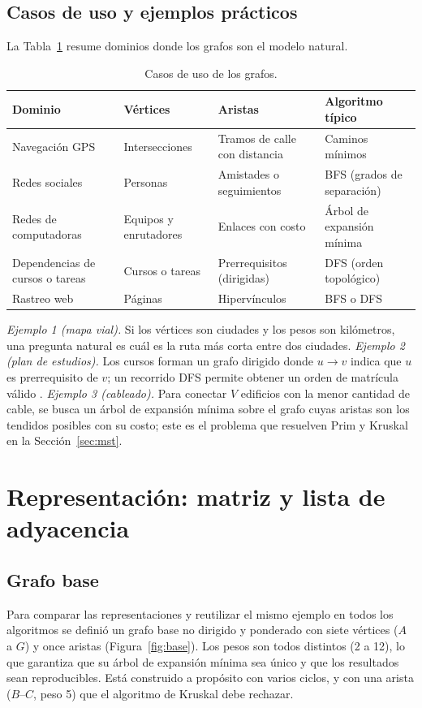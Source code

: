 \documentclass[conference]{IEEEtran}
\begin{document}
\subsection{Casos de uso y ejemplos prácticos}
La Tabla~\ref{tab:usos} resume dominios donde los grafos son el modelo natural.

\begin{table}[t]
\caption{Casos de uso de los grafos.}
\label{tab:usos}
\centering
\footnotesize
\setlength{\tabcolsep}{2pt}
\begin{tabular}{@{}p{1.9cm}p{2.0cm}p{1.95cm}p{2.15cm}@{}}
\toprule
Dominio & Vértices & Aristas & Algoritmo típico \\
\midrule
Navegación GPS & Intersecciones & Tramos de calle con distancia & Caminos mínimos \\
Redes sociales & Personas & Amistades o seguimientos & BFS (grados de separación) \\
Redes de computadoras & Equipos y enrutadores & Enlaces con costo & Árbol de expansión mínima \\
Dependencias de cursos o tareas & Cursos o tareas & Prerrequisitos (dirigidas) & DFS (orden topológico) \\
Rastreo web & Páginas & Hipervínculos & BFS o DFS \\
\bottomrule
\end{tabular}
\end{table}

\emph{Ejemplo 1 (mapa vial).} Si los vértices son ciudades y los pesos son kilómetros, una pregunta natural es cuál es la ruta más corta entre dos ciudades. \emph{Ejemplo 2 (plan de estudios).} Los cursos forman un grafo dirigido donde $u\rightarrow v$ indica que $u$ es prerrequisito de $v$; un recorrido DFS permite obtener un orden de matrícula válido \cite{clrs}. \emph{Ejemplo 3 (cableado).} Para conectar $V$ edificios con la menor cantidad de cable, se busca un árbol de expansión mínima sobre el grafo cuyas aristas son los tendidos posibles con su costo; este es el problema que resuelven Prim y Kruskal en la Sección~\ref{sec:mst}.

\section{Representación: matriz y lista de adyacencia}
\label{sec:repr}
\subsection{Grafo base}
Para comparar las representaciones y reutilizar el mismo ejemplo en todos los algoritmos se definió un grafo base no dirigido y ponderado con siete vértices ($A$ a $G$) y once aristas (Figura~\ref{fig:base}). Los pesos son todos distintos (2 a 12), lo que garantiza que su árbol de expansión mínima sea único y que los resultados sean reproducibles. Está construido a propósito con varios ciclos, y con una arista ($B$--$C$, peso 5) que el algoritmo de Kruskal debe rechazar.
\end{document}
